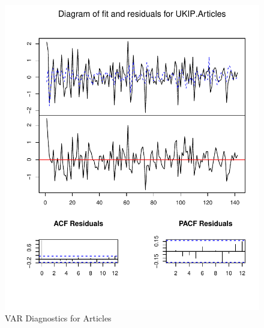 \documentclass[11pt, oneside]{article}   	%
\begin{document}
\begin{figure}[htbp]
\centering
\includegraphics{ukip_media_files/var-plot-articles.pdf}
\caption{VAR Diagnostics for Articles}
\end{figure}

\pagebreak
\end{document}
